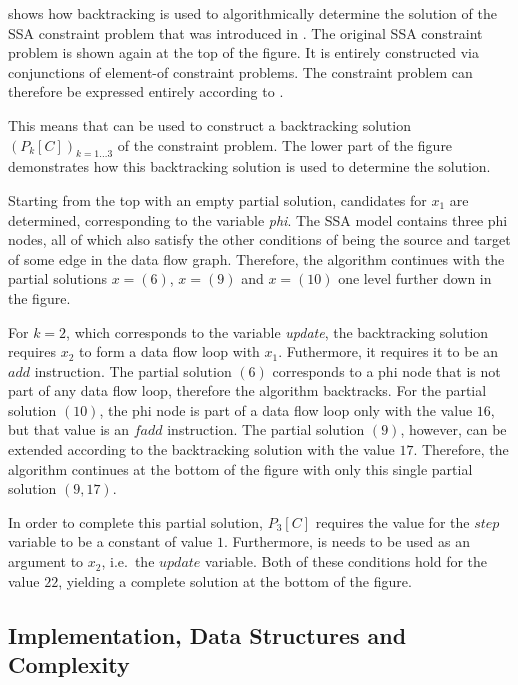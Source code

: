      shows how backtracking is used to algorithmically
    determine the solution of the SSA constraint problem that was introduced in
    .
    The original SSA constraint problem is shown again at the top of the figure.
    It is entirely constructed via conjunctions of element-of constraint
    problems.
    The constraint problem can therefore be expressed entirely according to
    .

    This means that  can be used to
    construct a backtracking solution $(P_k[C])_{k=1\dots3}$ of the constraint
    problem.
    The lower part of the figure demonstrates how this backtracking solution is
    used to determine the solution.

    Starting from the top with an empty partial solution, candidates for $x_1$
    are determined, corresponding to the variable {\em phi}.
    The SSA model contains three phi nodes, all of which also satisfy the other
    conditions of being the source and target of some edge in the data flow
    graph.
    Therefore, the algorithm continues with the partial solutions $x=(6)$,
    $x=(9)$ and $x=(10)$ one level further down in the figure.

    For $k=2$, which corresponds to the variable {\em update}, the backtracking
    solution requires $x_2$ to form a data flow loop with $x_1$.
    Futhermore, it requires it to be an $add$ instruction.
    The partial solution $(6)$ corresponds to a phi node that is not part of
    any data flow loop, therefore the algorithm backtracks.
    For the partial solution $(10)$, the phi node is part of a data flow loop
    only with the value $16$, but that value is an $fadd$ instruction.
    The partial solution $(9)$, however, can be extended according to the
    backtracking solution with the value $17$.
    Therefore, the algorithm continues at the bottom of the figure with only
    this single partial solution $(9,17)$.

    In order to complete this partial solution, $P_3[C]$ requires the value for
    the $step$ variable to be a constant of value $1$.
    Furthermore, is needs to be used as an argument to $x_2$, i.e.\ the
    $update$ variable.
    Both of these conditions hold for the value $22$, yielding a complete
    solution at the bottom of the figure.

\subsection{Implementation, Data Structures and Complexity}
\label{subsec:impl}

